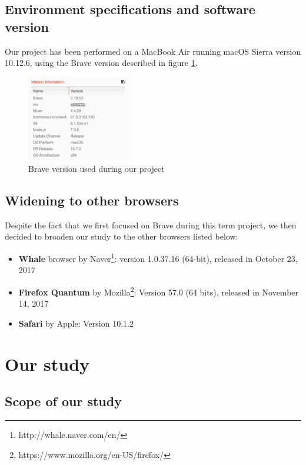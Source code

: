 \documentclass[journal]{IEEEtran}
\begin{document}
\subsection{Environment specifications and software version}

Our project has been performed on a MacBook Air running macOS Sierra version 10.12.6, using the Brave version described in figure \ref{fig:BraveVersion}.

\begin{figure}[h]
\centering
\includegraphics[width=0.4\textwidth]{images/BraveVersion.png}
\caption{Brave version used during our project}
\label{fig:BraveVersion}
\end{figure}


\subsection{Widening to other browsers}
\label{otherBrowsers}

Despite the fact that we first focused on Brave during this term project, we then decided to broaden our study to the other browsers listed below:

\begin{itemize}
\item \textbf{Whale} browser by Naver\footnote{http://whale.naver.com/en/}: version 1.0.37.16 (64-bit), released in October 23, 2017
\item \textbf{Firefox Quantum} by Mozilla\footnote{https://www.mozilla.org/en-US/firefox/}: Version 57.0 (64 bits), released in November 14, 2017
\item \textbf{Safari} by Apple: Version 10.1.2
\end{itemize}


\section{Our study}

\subsection{Scope of our study}
\end{document}
